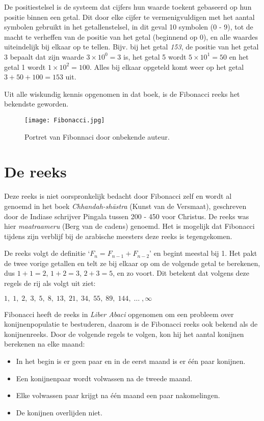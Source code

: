 \documentclass{article}
\begin{document}
De positiestelsel is de systeem dat cijfers hun waarde toekent gebaseerd op hun positie binnen een getal. Dit door elke cijfer te vermenigvuldigen met het aantal symbolen gebruikt in het getallenstelsel, in dit geval 10 symbolen (0 - 9), tot de macht te verheffen van de positie van het getal (beginnend op 0), en alle waardes uiteindelijk bij elkaar op te tellen. Bijv. bij het getal \textit{153}, de positie van het getal 3 bepaalt dat zijn waarde \(3 \times 10^0 = 3\) is, het getal 5 wordt \(5 \times 10^1 = 50\) en het getal 1 wordt \(1 \times 10^2 = 100\). Alles bij elkaar opgeteld komt weer op het getal \(3 + 50 + 100 = 153\) uit.

Uit alle wiskundig kennis opgenomen in dat boek, is de Fibonacci reeks het bekendste geworden.

\begin{figure}[Hh]
	\centering
	\texttt{[image: Fibonacci.jpg]}
	\caption{Portret van Fibonnaci door onbekende auteur.}
\end{figure}

\section{De reeks}

Deze reeks is niet oorspronkelijk bedacht door Fibonacci zelf en wordt al genoemd in het boek \textit{Chhandah-sh\=astra} (Kunst van de Versmaat), geschreven door de Indiase schrijver Pingala tussen 200 - 450 voor Christus. De reeks was hier \textit{maatraameru} (Berg van de cadens) genoemd. Het is mogelijk dat Fibonacci tijdens zijn verblijf bij de arabische meesters deze reeks is tegengekomen.

De reeks volgt de definitie `\(F_n = F_{n-1} + F_{n-2}\)' en begint meestal bij 1. Het pakt de twee vorige getallen en telt ze bij elkaar op om de volgende getal te berekenen, dus \(1 + 1 = 2\), \(1 + 2 = 3\), \(2 + 3 = 5\), en zo voort. Dit betekent dat volgens deze regels de rij als volgt uit ziet: 

\(1,\;1,\;2,\;3,\;5,\;8,\;13,\;21,\;34,\;55,\;89,\;144,\; \ldots\;, \infty\)

Fibonacci heeft de reeks in \textit{Liber Abaci} opgenomen om een probleem over konijnenpopulatie te bestuderen, daarom is de Fibonacci reeks ook bekend als de konijnenreeks. Door de volgende regels te volgen, kon hij het aantal konijnen berekenen na elke maand:

\begin{itemize}
\item{In het begin is er geen paar en in de eerst maand is er \'e\'en paar konijnen.}
\item{Een konijnenpaar wordt volwassen na de tweede maand.}
\item{Elke volwassen paar krijgt na \'e\'en maand een paar nakomelingen.}
\item{De konijnen overlijden niet.}
\end{itemize}
\end{document}
